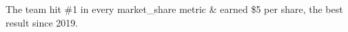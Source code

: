 \documentclass{article}
\begin{document}
The team hit \#1 in every market\_share metric \& earned \$5 per share,
the best result since 2019.
\end{document}
